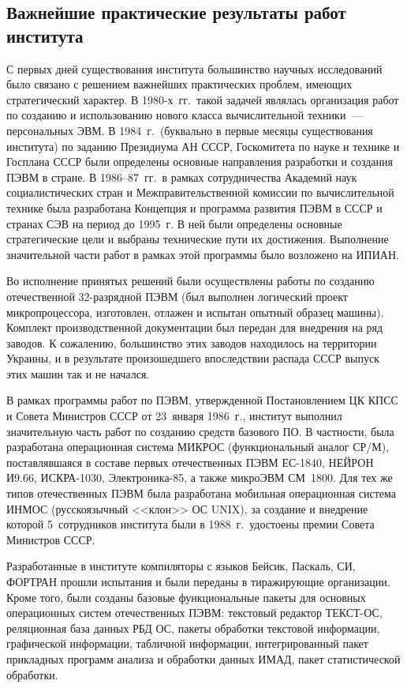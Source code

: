 \begin{multicols}{2}
     \section{Важнейшие практические результаты работ
института}

     С первых дней существования института большинство
научных исследований было связано с решением важнейших
практических проблем, име\-ющих стратегический характер. В 1980-х~гг.\ 
такой задачей являлась организация работ по созданию и
использованию нового класса вычислительной техники~---
персональных ЭВМ. В 1984~г.\ (буквально в первые месяцы
существования института) по заданию Президиума АН СССР,
Госкомитета по науке и технике и Госплана СССР были определены
основные направления разработки и создания ПЭВМ в стране. В
1986--87~гг.\ в рамках сотрудничества Академий наук
социалистических стран и Межправительственной комиссии по
вычислительной технике была разработана Концепция и программа
развития ПЭВМ в СССР и странах СЭВ на период до 1995~г. В
ней были определены основные стратегические цели и выбраны
технические пути их достижения. Выполнение значительной части
работ в рамках этой программы было возложено на ИПИАН.

     Во исполнение принятых решений были осуществлены работы
по созданию отечественной 32-раз\-ряд\-ной ПЭВМ (был выполнен
логический проект микропроцессора, изготовлен, отлажен и
испытан опытный образец машины). Комплект производственной
документации был передан для внед\-ре\-ния на ряд заводов. К
сожалению, большинство этих заводов находилось на территории
Украины, и в результате произошедшего впоследствии распада
СССР выпуск этих машин так и не начался.

     В рамках программы работ по ПЭВМ, утвержденной
Постановлением ЦК КПСС и Совета Министров СССР от 23~января
1986~г., институт выполнил значительную часть работ по
созданию средств базового ПО. В частности,
была разработана операционная сис\-те\-ма МИКРОС
(функциональный аналог СР/М), поставлявшаяся в составе первых
отечественных ПЭВМ ЕС-1840, НЕЙРОН И9.66, ИСКРА-1030,
Электроника-85, а также микроЭВМ СМ~1800. Для тех же типов
отечественных ПЭВМ была разработана мобильная операционная
система ИНМОС (русскоязычный <<клон>> ОС UNIX), за создание
и внедрение которой 5~сотрудников института были в 1988~г.\
удостоены премии Совета Министров СССР.

     Разработанные в институте компиляторы с языков Бейсик,
Паскаль, СИ, ФОРТРАН прошли %
испытания и были переданы в
тиражирующие организации. Кроме того, были созданы базовые
функциональные пакеты для основных операционных систем
отечественных ПЭВМ: текстовый редактор ТЕКСТ-ОС,
реляционная база данных РБД ОС, пакеты обработки текстовой
информации, графической информации, табличной информации,
интегрированный пакет прикладных программ анализа и обработки
данных ИМАД, пакет статистической обработки.
{\looseness=-1

}
\end{multicols}
